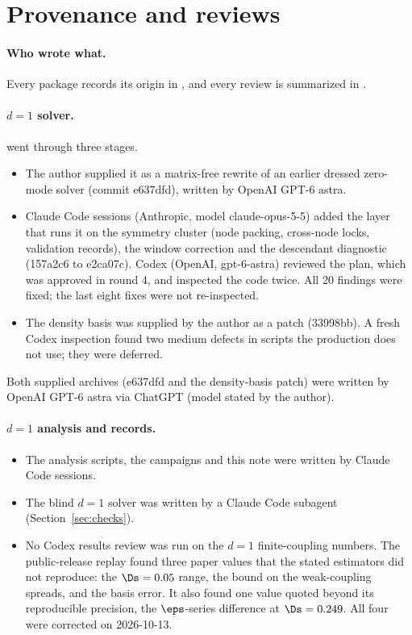 \section{Provenance and reviews}\label{app:prov}

\paragraph{Who wrote what.} Every package records its origin in , and every review is summarized
in .

\paragraph{$d=1$ solver.}  went through three stages.
\begin{itemize}
\item The author supplied it as a matrix-free rewrite of an earlier dressed zero-mode solver (commit e637dfd), written by
 OpenAI GPT-6 astra.
\item Claude Code sessions (Anthropic, model claude-opus-5-5) added the layer that runs it on the symmetry cluster
 (node packing, cross-node locks, validation records), the window correction and the descendant diagnostic
 (157a2c6 to e2ca07c). Codex (OpenAI, gpt-6-astra) reviewed the plan, which
 was approved in round 4, and inspected the code twice. All 20 findings were fixed; the last eight fixes were not
 re-inspected.
\item The density basis was supplied by the author as a patch (33998bb). A fresh Codex inspection found two medium
 defects in scripts the production does not use; they were deferred.
\end{itemize}
Both supplied archives (e637dfd and the density-basis patch) were written by OpenAI GPT-6 astra via ChatGPT (model stated by the author).

\paragraph{$d=1$ analysis and records.}
\begin{itemize}
\item The analysis scripts, the campaigns and this note were written by Claude Code sessions.
\item The blind $d=1$ solver was written by a Claude Code subagent (Section~\ref{sec:checks}).
\item No Codex results review was run on the $d=1$ finite-coupling numbers. The public-release replay found three
 paper values that the stated estimators did not reproduce: the $\Ds=0.05$ range, the bound on the weak-coupling
 spreads, and the basis error. It also found one value quoted beyond its reproducible precision, the $\eps$-series
 difference at $\Ds=0.249$. All four were corrected on 2026-10-13.
\end{itemize}

